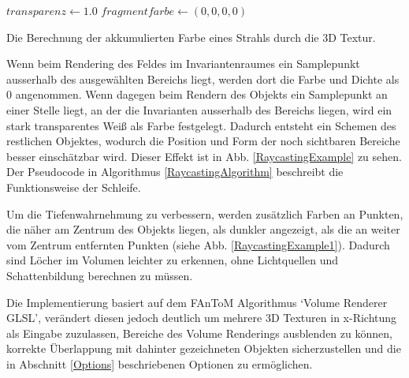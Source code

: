 \documentclass[a4paper,fontsize=12pt,toc=bib,halfparskip]{scrartcl}
\begin{document}
\begin{algorithm}[t]
	$transparenz\gets 1.0$\;
	$fragmentfarbe\gets (0, 0, 0, 0)$\;
	\vspace{0.5cm}
	\caption{Die Berechnung der akkumulierten Farbe eines Strahls durch die 3D Textur.}
	\label{RaycastingAlgorithm}
\end{algorithm}

Wenn beim Rendering des Feldes im Invariantenraumes ein Samplepunkt ausserhalb des ausgew\"ahlten Bereichs liegt, werden dort die Farbe und Dichte als 0 angenommen. Wenn dagegen beim Rendern des Objekts ein Samplepunkt an einer Stelle liegt, an der die Invarianten ausserhalb des Bereichs liegen, wird ein stark transparentes Wei{\ss} als Farbe festgelegt. Dadurch entsteht ein Schemen des restlichen Objektes, wodurch die Position und Form der noch sichtbaren Bereiche besser einsch\"atzbar wird. Dieser Effekt ist in Abb. \ref{RaycastingExample} zu sehen. Der Pseudocode in Algorithmus \ref{RaycastingAlgorithm} beschreibt die Funktionsweise der Schleife.

Um die Tiefenwahrnehmung zu verbessern, werden zus\"atzlich Farben an Punkten, die n\"aher am Zentrum des Objekts liegen, als dunkler angezeigt, als die an weiter vom Zentrum entfernten Punkten (siehe Abb. \ref{RaycastingExample1}). Dadurch sind L\"ocher im Volumen leichter zu erkennen, ohne Lichtquellen und Schattenbildung berechnen zu m\"ussen.

Die Implementierung basiert auf dem FAnToM Algorithmus `Volume Renderer GLSL', ver\"andert diesen jedoch deutlich um mehrere 3D Texturen in x-Richtung als Eingabe zuzulassen, Bereiche des Volume Renderings ausblenden zu k\"onnen, korrekte \"Uberlappung mit dahinter gezeichneten Objekten sicherzustellen und die in Abschnitt \ref{Options} beschriebenen Optionen zu erm\"oglichen.
\end{document}
